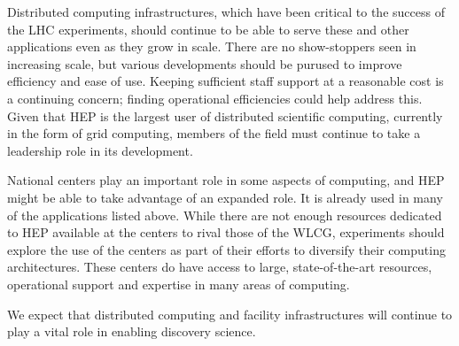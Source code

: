 Distributed computing infrastructures, which have been critical to the success of the LHC experiments, should continue to be able to serve these and other applications even as they grow in scale.  There are no show-stoppers seen in increasing scale, but various developments should be purused to improve efficiency and ease of use.  Keeping sufficient staff support at a reasonable cost is a continuing concern; finding operational efficiencies could help address this.  Given that HEP is the largest user of distributed scientific computing, currently in the form of grid computing, members of the field must continue to take a leadership role in its development.

National centers play an important role in some aspects of computing, and HEP might be able to take advantage of an expanded role.  It is already used in many of the applications listed above.  While there are not enough resources dedicated to HEP available at the centers to rival those of the WLCG, experiments should explore the use of the centers as part of their efforts to diversify their computing architectures.  These centers do have access to large, state-of-the-art resources, operational support and expertise in many areas of computing.

We expect that distributed computing and facility infrastructures will continue to play a vital role in enabling discovery science.

